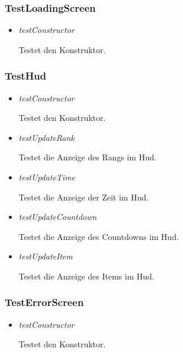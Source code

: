 \subsubsection{TestLoadingScreen}
\begin{itemize}
    \item \textit{testConstructor}
        \begin{leftbar}[0.9\linewidth]
            Testet den Konstruktor.
        \end{leftbar}
\end{itemize}

\subsubsection{TestHud}
\begin{itemize}
    \item \textit{testConstructor}
        \begin{leftbar}[0.9\linewidth]
            Testet den Konstruktor.
        \end{leftbar}
    \item \textit{testUpdateRank}
        \begin{leftbar}[0.9\linewidth]
            Testet die Anzeige des Rangs im Hud.
        \end{leftbar}
    \item \textit{testUpdateTime}
        \begin{leftbar}[0.9\linewidth]
            Testet die Anzeige der Zeit im Hud.
        \end{leftbar}
    \item \textit{testUpdateCountdown}
        \begin{leftbar}[0.9\linewidth]
            Testet die Anzeige des Countdowns im Hud.
        \end{leftbar}
    \item \textit{testUpdateItem}
        \begin{leftbar}[0.9\linewidth]
            Testet die Anzeige des Items im Hud.
        \end{leftbar}
\end{itemize}

\subsubsection{TestErrorScreen}
\begin{itemize}
    \item \textit{testConstructor}
        \begin{leftbar}[0.9\linewidth]
            Testet den Konstruktor.
        \end{leftbar}
\end{itemize}
\pagebreak
